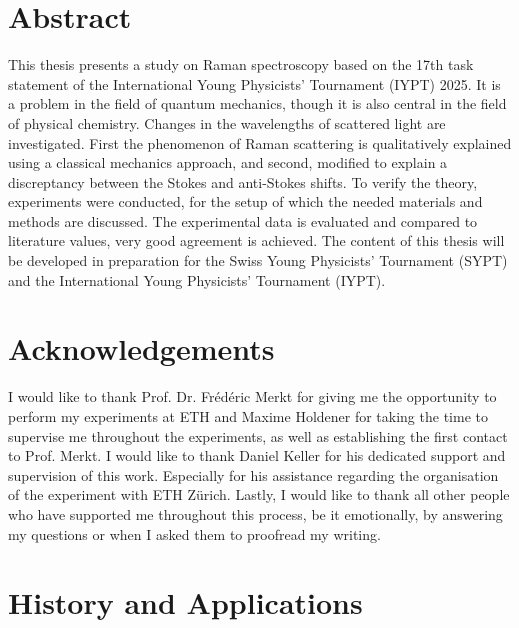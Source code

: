 \documentclass[a4paper]{article}
\begin{document}
\section*{Abstract}

This thesis presents a study on Raman spectroscopy based on the 17th task statement of the International Young Physicists' Tournament (IYPT) 2025. It is a problem in the field of quantum mechanics, though it is also central in the field of physical chemistry. Changes in the wavelengths of scattered light are investigated. First the phenomenon of Raman scattering is qualitatively explained using a classical mechanics approach, and second, modified to explain a discreptancy between the Stokes and anti-Stokes shifts. To verify the theory, experiments were conducted, for the setup of which the needed materials and methods are discussed. The experimental data is evaluated and compared to literature values, very good agreement is achieved. The content of this thesis will be developed in preparation for the Swiss Young Physicists' Tournament (SYPT) and the International Young Physicists' Tournament (IYPT).

\newpage



\section*{Acknowledgements}

I would like to thank Prof. Dr. Frédéric Merkt for giving me the opportunity to perform my experiments at ETH and Maxime Holdener for taking the time to supervise me throughout the experiments, as well as establishing the first contact to Prof. Merkt. I would like to thank Daniel Keller for his dedicated support and supervision of this work. Especially for his assistance regarding the organisation of the experiment with ETH Zürich. Lastly, I would like to thank all other people who have supported me throughout this process, be it emotionally, by answering my questions or when I asked them to proofread my writing.

\newpage
\tableofcontents
\newpage




\section{History and Applications}\label{hist_app}

\newpage
\end{document}
